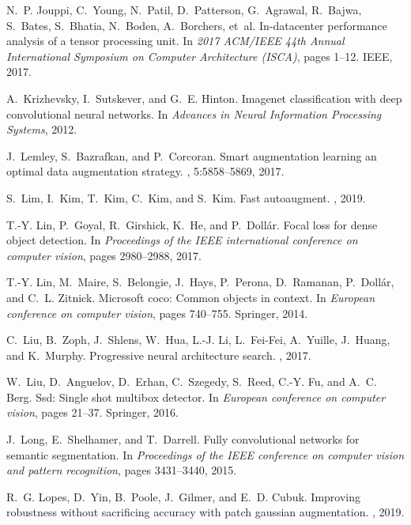 \documentclass[10pt,twocolumn,letterpaper]{article}
\begin{document}
\begin{thebibliography}{10}
N.~P. Jouppi, C.~Young, N.~Patil, D.~Patterson, G.~Agrawal, R.~Bajwa, S.~Bates,
  S.~Bhatia, N.~Boden, A.~Borchers, et~al.
\newblock In-datacenter performance analysis of a tensor processing unit.
\newblock In {\em 2017 ACM/IEEE 44th Annual International Symposium on Computer
  Architecture (ISCA)}, pages 1--12. IEEE, 2017.

A.~Krizhevsky, I.~Sutskever, and G.~E. Hinton.
\newblock Imagenet classification with deep convolutional neural networks.
\newblock In {\em Advances in Neural Information Processing Systems}, 2012.

J.~Lemley, S.~Bazrafkan, and P.~Corcoran.
\newblock Smart augmentation learning an optimal data augmentation strategy.
, 5:5858--5869, 2017.

S.~Lim, I.~Kim, T.~Kim, C.~Kim, and S.~Kim.
\newblock Fast autoaugment.
, 2019.

T.-Y. Lin, P.~Goyal, R.~Girshick, K.~He, and P.~Doll{\'a}r.
\newblock Focal loss for dense object detection.
\newblock In {\em Proceedings of the IEEE international conference on computer
  vision}, pages 2980--2988, 2017.

T.-Y. Lin, M.~Maire, S.~Belongie, J.~Hays, P.~Perona, D.~Ramanan,
  P.~Doll{\'a}r, and C.~L. Zitnick.
\newblock Microsoft coco: Common objects in context.
\newblock In {\em European conference on computer vision}, pages 740--755.
  Springer, 2014.

C.~Liu, B.~Zoph, J.~Shlens, W.~Hua, L.-J. Li, L.~Fei-Fei, A.~Yuille, J.~Huang,
  and K.~Murphy.
\newblock Progressive neural architecture search.
, 2017.

W.~Liu, D.~Anguelov, D.~Erhan, C.~Szegedy, S.~Reed, C.-Y. Fu, and A.~C. Berg.
\newblock Ssd: Single shot multibox detector.
\newblock In {\em European conference on computer vision}, pages 21--37.
  Springer, 2016.

J.~Long, E.~Shelhamer, and T.~Darrell.
\newblock Fully convolutional networks for semantic segmentation.
\newblock In {\em Proceedings of the IEEE conference on computer vision and
  pattern recognition}, pages 3431--3440, 2015.

R.~G. Lopes, D.~Yin, B.~Poole, J.~Gilmer, and E.~D. Cubuk.
\newblock Improving robustness without sacrificing accuracy with patch gaussian
  augmentation.
, 2019.


\end{thebibliography}
\end{document}
